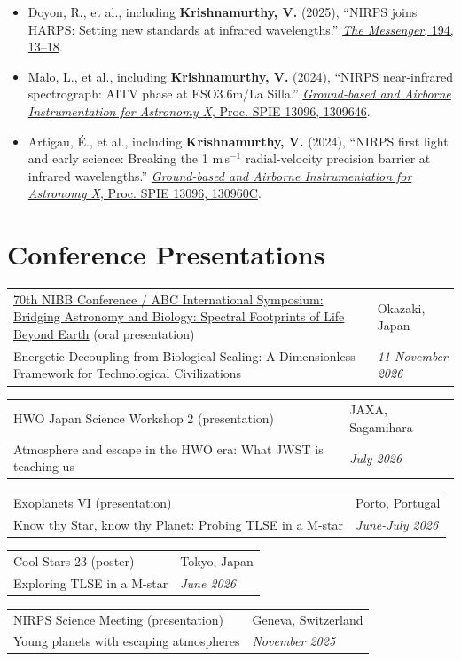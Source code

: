 \documentclass[10pt,a4paper]{article}
\makeatletter
\newcommand{\presentationentry}[4]{%
\begin{tabularx}{\textwidth}{
    @{}
    >{\raggedright\arraybackslash}X
    >{\raggedleft\arraybackslash}p{4.0cm}
    @{}
}
#1 & #2 \\
\textcolor{entrylight}{#3} &
\textcolor{entrylight}{\emph{#4}}
\end{tabularx}
\vspace{2pt}
}
\makeatother
\begin{document}
\begin{itemize}

\item
Doyon, R., et al., including \textbf{Krishnamurthy, V.} (2025),
``NIRPS joins HARPS: Setting new standards at infrared wavelengths.''
\href{https://doi.org/10.18727/0722-6691/5379}
{\emph{The Messenger}, 194, 13--18}.

\item
Malo, L., et al., including \textbf{Krishnamurthy, V.} (2024),
``NIRPS near-infrared spectrograph: AITV phase at ESO3.6m/La Silla.''
\href{https://doi.org/10.1117/12.3020168}
{\emph{Ground-based and Airborne Instrumentation for Astronomy X},
Proc. SPIE 13096, 1309646}.

\item
Artigau, É., et al., including \textbf{Krishnamurthy, V.} (2024),
``NIRPS first light and early science: Breaking the 1 m\,s$^{-1}$
radial-velocity precision barrier at infrared wavelengths.''
\href{https://doi.org/10.1117/12.3018994}
{\emph{Ground-based and Airborne Instrumentation for Astronomy X},
Proc. SPIE 13096, 130960C}.

\end{itemize}

\section{Conference Presentations}

\presentationentry
{\href{https://nibb-abc-conf70.nibb.ac.jp/home}{70th NIBB Conference / ABC International Symposium: Bridging Astronomy and Biology: Spectral Footprints of Life Beyond Earth} (oral presentation)}
{Okazaki, Japan}
{Energetic Decoupling from Biological Scaling: A Dimensionless Framework for Technological Civilizations}
{11 November 2026}

\presentationentry
{HWO Japan Science Workshop 2 (presentation)}
{JAXA, Sagamihara}
{Atmosphere and escape in the HWO era: What JWST is teaching us}
{July 2026}

\presentationentry
{Exoplanets VI (presentation)}
{Porto, Portugal}
{Know thy Star, know thy Planet: Probing TLSE in a M-star}
{June-July 2026}

\presentationentry
{Cool Stars 23 (poster)}
{Tokyo, Japan}
{Exploring TLSE in a M-star}
{June 2026}

\presentationentry
{NIRPS Science Meeting (presentation)}
{Geneva, Switzerland}
{Young planets with escaping atmospheres}
{November 2025}
\end{document}
